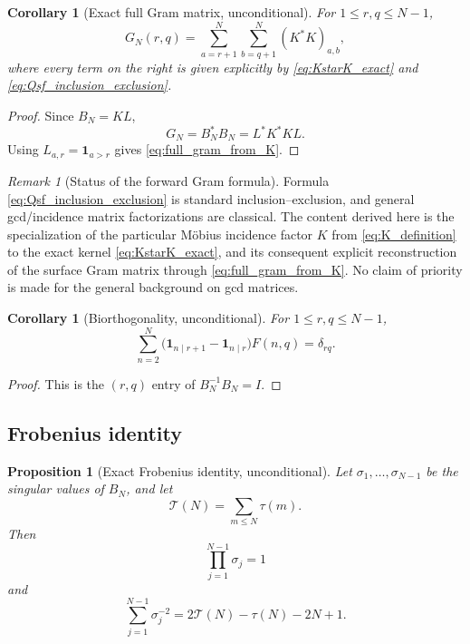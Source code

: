 \documentclass[11pt]{amsart}
\numberwithin{equation}{section}
\theoremstyle{plain}
\newtheorem{proposition}[theorem]{Proposition}
\newtheorem{corollary}[theorem]{Corollary}
\theoremstyle{definition}
\theoremstyle{remark}
\newtheorem{remark}[theorem]{Remark}
\newcommand{\one}{\mathbf 1}
\newcommand{\Fsurf}{F}
\newcommand{\TauSum}{\mathcal T}
\begin{document}
\begin{corollary}[Exact full Gram matrix, unconditional]
\label{cor:full_gram_exact}
For $1\le r,q\le N-1$,
\begin{equation}
G_N(r,q)
=\sum_{a=r+1}^{N}\sum_{b=q+1}^{N}(K^*K)_{a,b},
\label{eq:full_gram_from_K}
\end{equation}
where every term on the right is given explicitly by \eqref{eq:KstarK_exact} and \eqref{eq:Qsf_inclusion_exclusion}.
\end{corollary}

\begin{proof}
Since $B_N=KL$,
\begin{equation}
G_N=B_N^*B_N=L^*K^*KL.
\label{eq:G_LKL}
\end{equation}
Using $L_{a,r}=\one_{a>r}$ gives \eqref{eq:full_gram_from_K}.
\end{proof}

\begin{remark}[Status of the forward Gram formula]
\label{rem:forward_gram_status}
Formula \eqref{eq:Qsf_inclusion_exclusion} is standard inclusion--exclusion, and general gcd/incidence matrix factorizations are classical.  The content derived here is the specialization of the particular Möbius incidence factor $K$ from \eqref{eq:K_definition} to the exact kernel \eqref{eq:KstarK_exact}, and its consequent explicit reconstruction of the surface Gram matrix through \eqref{eq:full_gram_from_K}.  No claim of priority is made for the general background on gcd matrices.
\end{remark}

\begin{corollary}[Biorthogonality, unconditional]
\label{cor:biorthogonality}
For $1\le r,q\le N-1$,
\begin{equation}
\sum_{n=2}^{N}
\bigl(\one_{n\mid r+1}-\one_{n\mid r}\bigr)\Fsurf(n,q)
=\delta_{rq}.
\label{eq:biorthogonality}
\end{equation}
\end{corollary}

\begin{proof}
This is the $(r,q)$ entry of $B_N^{-1}B_N=I$.
\end{proof}

\subsection{Frobenius identity}
\label{subsec:frobenius}

\begin{proposition}[Exact Frobenius identity, unconditional]
\label{prop:frobenius}
Let $\sigma_1,\ldots,\sigma_{N-1}$ be the singular values of $B_N$, and let
\begin{equation}
\TauSum(N)=\sum_{m\le N}\tau(m).
\label{eq:tau_summatory}
\end{equation}
Then
\begin{equation}
\prod_{j=1}^{N-1}\sigma_j=1
\label{eq:singular_product}
\end{equation}
and
\begin{equation}
\sum_{j=1}^{N-1}\sigma_j^{-2}
=2\TauSum(N)-\tau(N)-2N+1.
\label{eq:frobenius_identity}
\end{equation}
\end{proposition}
\end{document}
